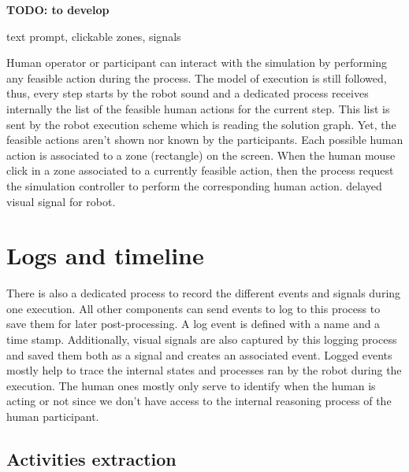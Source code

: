 \textbf{TODO: to develop}

text prompt, clickable zones, signals

Human operator or participant can interact with the simulation by performing any feasible action during the process. The model of execution is still followed, thus, every step starts by the robot sound and a dedicated process receives internally the list of the feasible human actions for the current step. This list is sent by the robot execution scheme which is reading the solution graph. Yet, the feasible actions aren't shown nor known by the participants.
Each possible human action is associated to a zone (rectangle) on the screen. When the human mouse click in a zone associated to a currently feasible action, then the process request the simulation controller to perform the corresponding human action.  delayed visual signal for robot.

\section{Logs and timeline}

There is also a dedicated process to record the different events and signals during one execution. All other components can send events to log to this process to save them for later post-processing. A log event is defined with a name and a time stamp. Additionally, visual signals are also captured by this logging process and saved them both as a signal and creates an associated event. Logged events mostly help to trace the internal states and processes ran by the robot during the execution. The human ones mostly only serve to identify when the human is acting or not since we don't have access to the internal reasoning process of the human participant. 

\subsection{Activities extraction}

